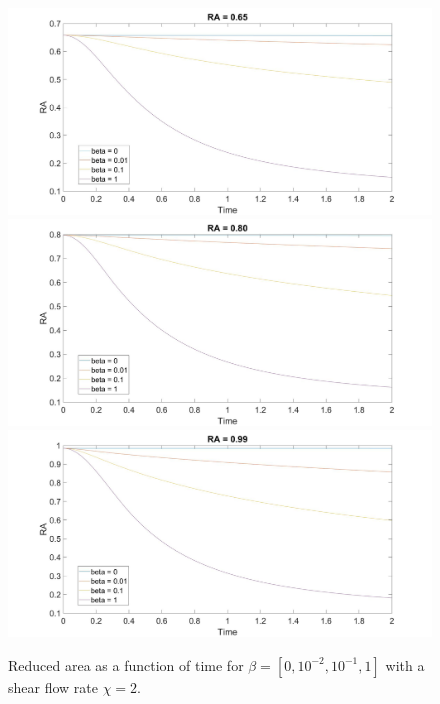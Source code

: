 \documentclass[aps,prl,showpacs]{revtex4}
\begin{document}
\begin{figure}
	\centering
	\includegraphics[width=.9\textwidth]{figures/10.jpg}
	\includegraphics[width=.9\textwidth]{figures/11.jpg}
	\includegraphics[width=.9\textwidth]{figures/12.jpg}
	\caption{Reduced area as a function of time for $\beta = [0, 10^{-2},10^{-1}, 1]$ with a shear flow rate $\chi = 2$.}
\end{figure}
 
\end{document}
